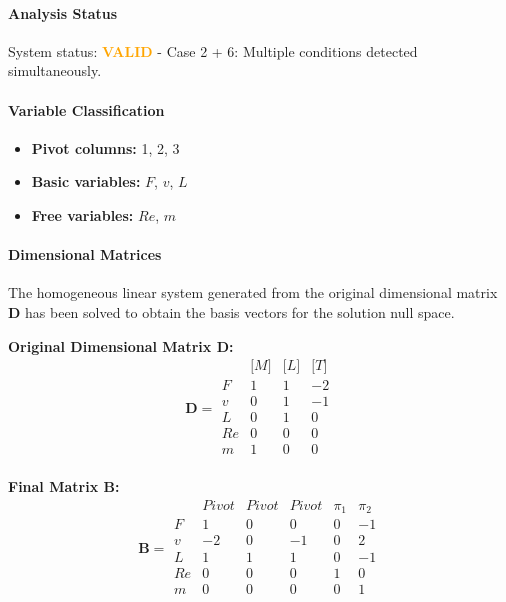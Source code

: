 \paragraph{Analysis Status}
System status: \textcolor{orange}{\textbf{VALID}} - Case 2 + 6: Multiple conditions detected simultaneously.


\paragraph{Variable Classification}
\begin{itemize}
\item \textbf{Pivot columns:} 1, 2, 3
\item \textbf{Basic variables:} $F$, $v$, $L$
\item \textbf{Free variables:} $Re$, $m$
\end{itemize}

                \paragraph{Dimensional Matrices}
                The homogeneous linear system generated from the original dimensional matrix $\mathbf{D}$ has been solved to obtain the basis vectors for the solution null space.

                \textbf{Original Dimensional Matrix $\mathbf{D}$:}
                \[\mathbf{D} = \begin{array}{r|rrr}
                & \text{[}M\text{]} & \text{[}L\text{]} & \text{[}T\text{]} \\
                \hline
                F & 1 & 1 & -2 \\
v & 0 & 1 & -1 \\
L & 0 & 1 & 0 \\
Re & 0 & 0 & 0 \\
m & 1 & 0 & 0 \\

                \end{array}\]


        \textbf{Final Matrix $\mathbf{B}$:}
        \[\mathbf{B} = \begin{array}{r|rrrrr}
        & Pivot & Pivot & Pivot & \pi_{1} & \pi_{2} \\
        \hline
        F & 1 & 0 & 0 & 0 & -1 \\
v & -2 & 0 & -1 & 0 & 2 \\
L & 1 & 1 & 1 & 0 & -1 \\
Re & 0 & 0 & 0 & 1 & 0 \\
m & 0 & 0 & 0 & 0 & 1 \\

        \end{array}\]

